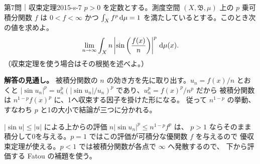 \begin{problem}{第7問｜収束定理}{2015-s-7}
$p>0$ を定数とする。測度空間 $(X,\mathfrak B,\mu)$ 上の $p$ 乗可積分関数 $f$ は
$0<f<\infty$ かつ $\int_Xf^p\,\mathrm{d}\mu=1$ を満たしているとする。このとき次の値を求めよ。
\[
\lim_{n\to\infty}\int_X n\left|\sin\left(\frac{f(x)}n\right)\right|^p\,\mathrm{d}\mu(x).
\]
（収束定理を使う場合はその根拠を述べよ。）
\end{problem}
\begin{memo*}
\textbf{解答の見通し。}
被積分関数の $n$ の効き方を先に取り出す。$u_n=f(x)/n$ とおくと
$|\sin u_n|^p=u_n^p(|\sin u_n|/u_n)^p$ であり、$u_n^p=f(x)^p/n^p$ だから
被積分関数は $n^{1-p}f(x)^p$ に、1へ収束する因子を掛けた形になる。
従って $n^{1-p}$ の挙動、すなわち $p$ と1の大小で結論が三つに分かれる。

$|\sin u|\le|u|$ による上からの評価 $n|\sin u_n|^p\le n^{1-p}f^p$ は、
$p>1$ ならそのまま積分して0を与える。$p=1$ ではこの評価が可積分な優関数 $f$ を与えるので
優収束定理が使える。$p<1$ では被積分関数が各点で $\infty$ へ発散するので、
下から評価する Fatou の補題を使う。
\end{memo*}
